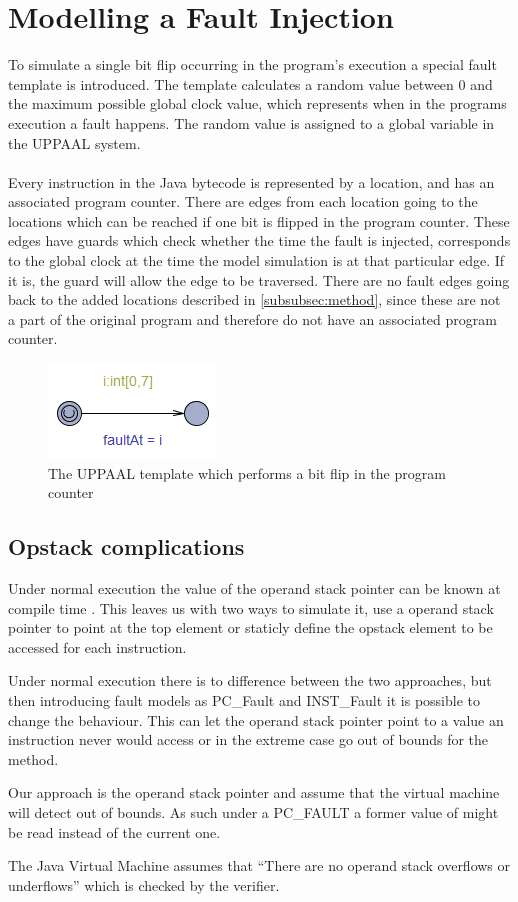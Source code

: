 \section{Modelling a Fault Injection}
To simulate a single bit flip occurring in the program's execution a special fault template is introduced. The template calculates a random value between $0$ and the maximum possible global clock value, which represents when in the programs execution a fault happens. The random value is assigned to a global variable in the UPPAAL system.\\\\
Every instruction in the Java bytecode is represented by a location, and has an associated program counter. There are edges from each location going to the locations which can be reached if one bit is flipped in the program counter. These edges have guards which check whether the time the fault is injected, corresponds to the global clock at the time the model simulation is at that particular edge. If it is, the guard will allow the edge to be traversed. There are no fault edges going back to the added locations described in \cref{subsubsec:method}, since these are not a part of the original program and therefore do not have an associated program counter.
\begin{figure}[H]
\centering
\includegraphics{figures/fault.PNG}
\caption{The UPPAAL template which performs a bit flip in the program counter}
\end{figure}


\subsection{Opstack complications}
Under normal execution the value of the operand stack pointer can be known at compile  time . This leaves us with two ways to simulate it, use a operand stack pointer to point at the top element or staticly define the opstack element to be accessed for each instruction.

Under normal execution there is to difference between the two approaches, but then introducing fault models as PC\_Fault and INST\_Fault it is possible to change the behaviour. This can let the operand stack pointer point to a value an instruction never would access or in the extreme case go out of bounds for the method.

Our approach is the operand stack pointer and assume that the virtual machine will detect out of bounds. As such under a PC\_FAULT a former value of might be read instead of the current one.

The Java Virtual Machine assumes that ``There are no operand stack overflows or underflows'' \cite[c. 4.10]{java_spec} which is checked by the verifier.
